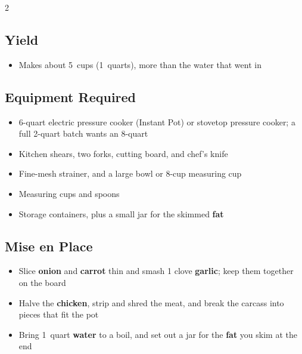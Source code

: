\documentclass[11pt,letterpaper]{article}
\begin{document}
{\scriptsize
\setlength{\columnsep}{20pt}
\setlength{\multicolsep}{6pt}
\begin{multicols}{2}
\setlength{\parindent}{0pt}
\setlength{\parskip}{2pt}
\setlength{\itemsep}{0pt}
\setlength{\parsep}{0pt}

\subsection*{Yield}
\begin{itemize}
    \item Makes about 5~cups (1~quarts), more than the water that went in
\end{itemize}

\subsection*{Equipment Required}
\begin{itemize}
    \item 6-quart electric pressure cooker (Instant Pot) or stovetop pressure cooker; a full 2-quart batch wants an 8-quart
    \item Kitchen shears, two forks, cutting board, and chef's knife
    \item Fine-mesh strainer, and a large bowl or 8-cup measuring cup
    \item Measuring cups and spoons
    \item Storage containers, plus a small jar for the skimmed \textbf{fat}
\end{itemize}

\subsection*{Mise en Place}
\begin{itemize}
    \item Slice  \textbf{onion} and  \textbf{carrot} thin and smash 1 clove \textbf{garlic}; keep them together on the board
    \item Halve the \textbf{chicken}, strip and shred the meat, and break the carcass into pieces that fit the pot
    \item Bring 1~quart \textbf{water} to a boil, and set out a jar for the \textbf{fat} you skim at the end
\end{itemize}


\end{multicols}}
\end{document}
